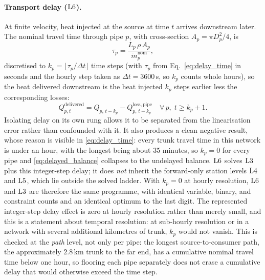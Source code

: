 \paragraph{Transport delay ($\mathrm{L6}$).}
At finite velocity, heat injected at the source at time $t$ arrives downstream later. The
nominal travel time through pipe $p$, with cross-section $A_p = \pi D_p^2/4$, is
\begin{equation}
  \tau_p = \frac{L_p\, \rho\, A_p}{\dot{m}_p^{\mathrm{nom}}},
  \label{eq:delay_time}
\end{equation}
discretised to $k_p = \lfloor \tau_p/\Delta t \rfloor$ time steps (with $\tau_p$ from
Eq.~\eqref{eq:delay_time} in seconds and the hourly step taken as $\Delta t = 3600$\,s, so
$k_p$ counts whole hours), so the heat delivered downstream is the heat injected $k_p$ steps
earlier less the corresponding losses:
\begin{equation}
  Q_{p,t}^{\mathrm{delivered}} =
    Q_{p,\,t-k_p} - Q_{p,\,t-k_p}^{\mathrm{loss,pipe}}
  \quad \forall\, p,\; t \geq k_p{+}1.
  \label{eq:delayed_balance}
\end{equation}
Isolating delay on its own rung allows it to be separated from the linearisation error rather 
than confounded with it. It also produces a clean negative result, whose reason is visible 
in \eqref{eq:delay_time}: every trunk travel time in this network is under an hour, with 
the longest being about 35 minutes, so \(k_p=0\) for every pipe and \eqref{eq:delayed_balance} 
collapses to the undelayed balance. \(\mathrm{L6}\) solves \(\mathrm{L3}\) plus this integer-step delay; 
it does \emph{not} inherit the forward-only station levels \(\mathrm{L4}\) and \(\mathrm{L5}\), which 
lie outside the solved ladder. With \(k_p=0\) at hourly resolution, \(\mathrm{L6}\) and \(\mathrm{L3}\) 
are therefore the same programme, with identical variable, binary, and constraint counts and 
an identical optimum to the last digit. The represented integer-step delay effect is zero at 
hourly resolution rather than merely small, and this is a statement about temporal resolution: 
at sub-hourly resolution or in a network with several additional kilometres of trunk, \(k_p\) 
would not vanish. This is checked at the \emph{path} level, not only per pipe: the longest 
source-to-consumer path, the approximately \(2.8\,\mathrm{km}\) trunk to the far end, has a 
cumulative nominal travel time below one hour, so flooring each pipe separately does not 
erase a cumulative delay that would otherwise exceed the time step.